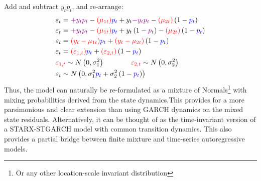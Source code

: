 Add and subtract {\color{violet}$y_t p_t $}, and re-arrange:
\begin{equation}\label{eq:starmix}
\begin{gathered}
  {\varepsilon _t} =  {\color{violet}+ {y_t}{p_t}} - {\color{red} \left( \mu _{1t}\right)}{\color{blue} {p_t}} + {y_t} {\color{violet} - {y_t}{p_t}} - {\color{red} \left(\mu _{2t} \right)} \left(1 - {\color{blue}{p_t}} \right)\hfill \\
  {\varepsilon _t} = {\color{violet}+{y_t}{p_t}} - {\color{red}\left( \mu _{1t} \right)}{\color{blue}{p_t}} + {y_t}\left( 1 - {\color{violet}{p_t}} \right) - {\color{red} \left( \mu _{2t} \right)}\left( 1 -{\color{blue} {p_t}} \right) \hfill \\
  {\varepsilon _t} = {\color{red} \left( {y_t} - \mu _{1t} \right)}{\color{blue}{p_t}} + {\color{red}\left( {y_t} - \mu _{2t} \right)}\left(1 - {\color{blue}{p_t}} \right) \hfill \\
  {\varepsilon _t} = {\color{red}\left( \varepsilon _{1,t} \right)}{\color{blue}{p_t}} +{\color{red}\left(\varepsilon _{2,t} \right)}\left(1 - {\color{blue}{p_t}} \right) \hfill \\
 {\color{red} {\varepsilon _{1,t}}} \sim N\left( {0,\sigma _1^2} \right) \hfill {\color{red}{\varepsilon
  _{2,t}}} \sim N\left( {0,\sigma _2^2} \right) \hfill \\
  {\varepsilon _t} \sim N\left( 0,\sigma _1^2{\color{blue}{p_t}} +\sigma _2^2\left(1 - {\color{blue}{p_t}} \right)\right) \hfill \\
\end{gathered}
\end{equation}
Thus, the model can naturally be re-formulated as a mixture of
Normals\footnote{Or any other location-scale invariant distribution} with
mixing probabilities derived from the state dynamics.This provides for a more
parsimonious and clear extension than using GARCH dynamics on the mixed state
residuals. Alternatively, it can be thought of as the time-invariant version of
a STARX-STGARCH model with common transition dynamics. This also provides a
partial bridge between finite mixture and time-series autoregressive models.

